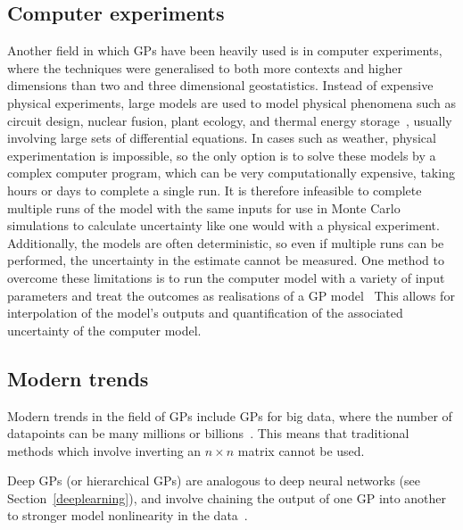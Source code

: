 \subsection{Computer experiments}

Another field in which \acp{GP} have been heavily used is in computer experiments, where the techniques were generalised to both more contexts and higher dimensions than two and three dimensional geostatistics.
Instead of expensive physical experiments, large models are used to model physical phenomena such as circuit design, nuclear fusion, plant ecology, and thermal energy storage~\autocite[409]{sacks1989}, usually involving large sets of differential equations.
In cases such as weather, physical experimentation is impossible, so the only option is to solve these models by a complex computer program, which can be very computationally expensive, taking hours or days to complete a single run.
It is therefore infeasible to complete multiple runs of the model with the same inputs for use in Monte Carlo simulations to calculate uncertainty like one would with a physical experiment.
Additionally, the models are often deterministic, so even if multiple runs can be performed, the uncertainty in the estimate cannot be measured.
One method to overcome these limitations is to run the computer model with a variety of input parameters and treat the outcomes as realisations of a \ac{GP} model~\autocite[163]{bachoc2017}
This allows for interpolation of the model's outputs and quantification of the associated uncertainty of the computer model.

\subsection{Modern trends}

Modern trends in the field of \acp{GP} include \acp{GP} for big data, where the number of datapoints can be many millions or billions~\autocite{hensman2013}.
This means that traditional methods which involve inverting an \(n \times n\) matrix cannot be used.

Deep \acp{GP} (or hierarchical \acp{GP}) are analogous to deep neural networks (see Section~\ref{deeplearning}), and involve chaining the output of one \ac{GP} into another to stronger model nonlinearity in the data~\autocite{damianou2013}.
